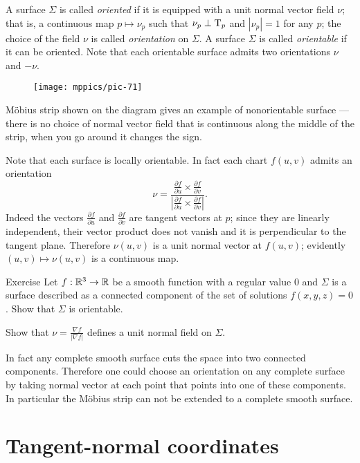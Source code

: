 A surface $\Sigma$ is called \emph{oriented} if it is equipped with a unit normal vector field $\nu$;
that is, a continuous map $p\mapsto \nu_p$ such that $\nu_p\perp\mathrm{T}_p$ and $|\nu_p|=1$ for any $p$;
the choice of the field $\nu$ is called \emph{orientation} on $\Sigma$.
A surface $\Sigma$ is called \emph{orientable} if it can be oriented.
Note that each orientable surface admits two orientations $\nu$ and $-\nu$. %

\begin{wrapfigure}{o}{40 mm}
\vskip-0mm
\centering
\texttt{[image: mppics/pic-71]}
\vskip0mm
\end{wrapfigure}

M\"obius strip shown on the diagram gives an example of nonorientable surface --- there is no choice of normal vector field that is continuous along the middle of the strip, 
when you go around it changes the sign.

Note that each surface is locally orientable.
In fact each chart $f(u,v)$ admits an orientation 
\[\nu=
\frac{\tfrac{\partial f}{\partial u}\times \tfrac{\partial f}{\partial v}}
{\left|\tfrac{\partial f}{\partial u}\times \tfrac{\partial f}{\partial v}\right|}.\]
Indeed the vectors $\tfrac{\partial f}{\partial u}$ and $\tfrac{\partial f}{\partial v}$ are tangent vectors at $p$; 
since they are linearly independent, their vector product does not vanish and it is perpendicular to the tangent plane.
Therefore $\nu(u,v)$ is a unit normal vector at $f(u,v)$;
evidently $(u,v)\mapsto \nu(u,v)$ is a continuous map. 

\begin{thm}{Exercise}
Let $f:\mathbb{R}^3\to\mathbb{R}$ be a smooth function with a regular value $0$ and $\Sigma$ is a surface described as a connected component of the set of solutions $f(x,y,z)=0$.
Show that $\Sigma$ is orientable.
\end{thm}

 Show that $\nu=\tfrac{\nabla f}{|\nabla f|}$ defines a unit normal field on $\Sigma$.


In fact any complete smooth surface cuts the space into two connected components.
Therefore one could choose an orientation on any complete surface by taking normal vector at each point that points into one of these components. %
In particular the M\"obius strip can not be extended to a complete smooth surface.

\section*{Tangent-normal coordinates} 

